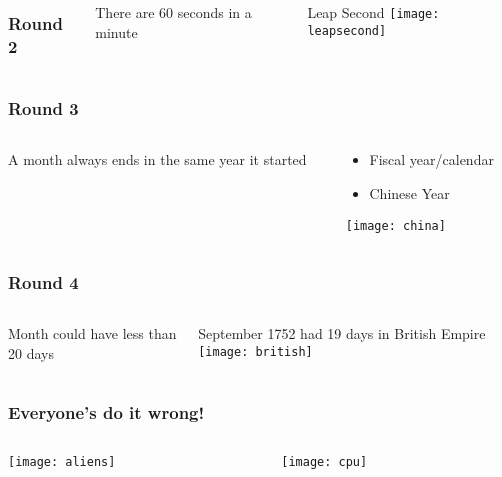 \documentclass[aspectratio=169, 15pt,usenames,dvipsnames]{beamer}
\begin{document}
	\begin{gdblank}
		\begin{columns}
			\frametitle{Round 2}    
			\begin{column}{0.70\textwidth}
				\centering
				\LARGE There are 60 seconds in a minute 
				\pause     
			\end{column}
			\begin{column}{0.3\textwidth}
				\large\centering Leap Second
				\vskip0.5cm
				\texttt{[image: leapsecond]}
			\end{column}
		\end{columns}
	\end{gdblank}
	\begin{gdblank}
		\frametitle{Round 3}    
		\begin{columns}
			\begin{column}{0.70\textwidth}
				\centering
				\LARGE A month always ends in the same year it started
				\pause     
			\end{column}
			\begin{column}{0.3\textwidth}
				\large\centering 
				\begin{itemize}
					\item Fiscal year/calendar
					\item Chinese Year
				\end{itemize}
				\vskip0.5cm
				\texttt{[image: china]}
			\end{column}
		\end{columns}
	\end{gdblank} 
	\begin{gdblank}
		\frametitle{Round 4}    
		\begin{columns}
			\begin{column}{0.70\textwidth}
				\centering
				\LARGE Month could have less than 20 days
				\pause     
			\end{column}
			\begin{column}{0.3\textwidth}
				\large\centering  September 1752 had 19 days in British Empire
				\vskip0.5cm
				\texttt{[image: british]}
			\end{column}
		\end{columns}
	\end{gdblank} 
	\begin{gdblank}
		\frametitle{Everyone's do it wrong!}
		\centering{\fontsize{140pt}{150pt}\selectfont\bf ?}
	\end{gdblank}   
	\begin{gdblank}
		\begin{columns}
			\begin{column}{0.5\textwidth}
				\texttt{[image: aliens]}				

			\end{column}
			\pause
			\begin{column}{0.5\textwidth}
				\texttt{[image: cpu]}
			\end{column}
		\end{columns}				
	\end{gdblank}  
\end{document}

